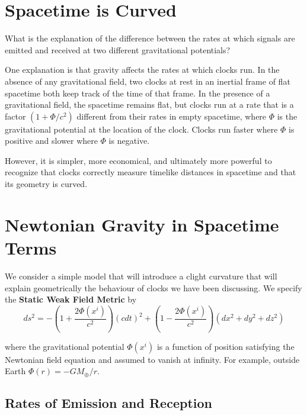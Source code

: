 \section{Spacetime is Curved}
\label{sec:spaceCurve}

\begin{qst}
    What is the explanation of the difference between the rates at which signals are emitted and received at two different gravitational potentials?
\end{qst}

One explanation is that gravity affects the rates at which clocks run. In the absence of any gravitational field, two clocks at rest in an inertial frame of flat spacetime both keep track of the time of that frame. In the presence of a gravitational field, the spacetime remains flat, but clocks run at a rate that is a factor $(1+\Phi/c^2)$ different from their rates in empty spacetime, where $\Phi$ is the gravitational potential at the location of the clock. Clocks run faster where $\Phi$ is positive and slower where $\Phi$ is negative.


However, it is simpler, more economical, and ultimately more powerful to recognize that clocks correctly measure timelike distances in spacetime and that its geometry is curved.

\section{Newtonian Gravity in Spacetime Terms}
\label{sec:NewtGrav}

We consider a simple model that will introduce a clight curvature that will explain geometrically the behaviour of clocks we have been discussing. We specify the \textbf{Static Weak Field Metric} by \begin{equation}
    \boxed{ds^2 = -\left(1+\frac{2\Phi(x^i)}{c^2}\right)(cdt)^2+\left(1-\frac{2\Phi(x^i)}{c^2}\right)(dx^2+dy^2+dz^2)}
\end{equation}

where the gravitational potential $\Phi(x^i)$ is a function of position satisfying the Newtonian field equation and assumed to vanish at infinity. For example, outside Earth $\Phi(r) = -GM_{\oplus}/r$. 

\subsection{Rates of Emission and Reception}


